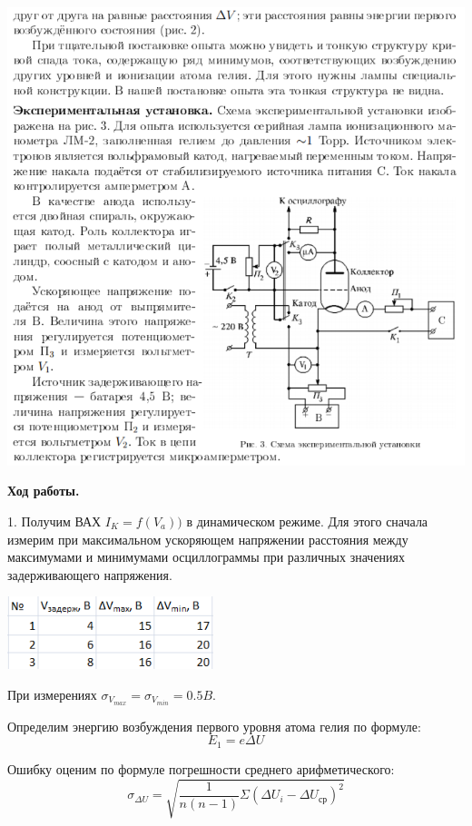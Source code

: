 \documentclass[12pt]{article}
\begin{document}
\begin{center}
    	\includegraphics[width=16cm]{theory4.png}\\
    \end{center}
    
    \begin{center}
    	\textbf{\large Ход работы.}
    \end{center}
    
    1. Получим ВАХ $I_K = f(V_a))$ в динамическом режиме. Для этого сначала измерим при максимальном ускоряющем напряжении расстояния между максимумами и минимумами осциллограммы при различных значениях задерживающего напряжения.
    
    \begin{center}
    	\includegraphics[width=6cm]{table1.png}
    \end{center}
    
    При измерениях $\sigma_{V_{max}} = \sigma_{V_{min}} = 0.5B$.
    
    Определим энергию возбуждения первого уровня атома гелия по формуле: $$E_1 = e\Delta U$$
    
    Ошибку оценим по формуле погрешности среднего арифметического: $$\sigma_{\Delta U} = \sqrt{\frac{1}{n(n-1)}\Sigma (\Delta U_i - \Delta U_{ср})^2}$$
    
\end{document}
